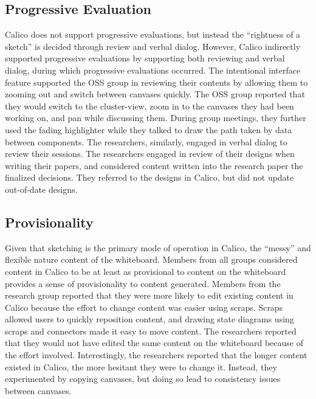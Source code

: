 \subsection{Progressive Evaluation}
Calico does not support progressive evaluations, but instead the ``rightness of a sketch'' is decided through review and verbal dialog. However, Calico indirectly supported progressive evaluations by supporting both reviewing and verbal dialog, during which progressive evaluations occurred. The intentional interface feature supported the OSS group  in reviewing their contents by allowing them to zooming out and switch between canvases quickly. The OSS group reported that they would switch to the cluster-view, zoom in to the canvases they had been working on, and pan while discussing them. During group meetings, they further used the fading highlighter while they talked to draw the path taken by data between components. The researchers, similarly, engaged in verbal dialog to review their sessions. The researchers engaged in review of their designs when writing their papers, and considered content written into the research paper the finalized decisions. They referred to the designs in Calico, but did not update out-of-date designs.


\subsection{Provisionality}
Given that sketching is the primary mode of operation in Calico, the ``messy'' and flexible nature content of the whiteboard. Members from all groups considered content in Calico to be at least as provisional to content on the whiteboard provides a sense of provisionality to content generated. Members from the research group reported that they were more likely to edit existing content in Calico because the effort to change content was easier using scraps. Scraps allowed users to quickly reposition content, and drawing state diagrams using scraps and connectors made it easy to move content. The researchers reported that they would not have edited the same content on the whiteboard because of the effort involved. Interestingly, the researchers reported that the longer content existed in Calico, the more hesitant they were to change it. Instead, they experimented by copying canvases, but doing so lead to consistency issues between canvases.

